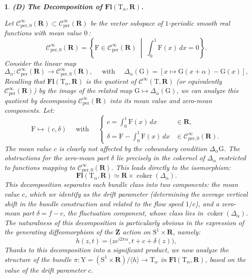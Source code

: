 \documentclass[10pt,letterpaper,reqno]{amsart}
\theoremstyle{article}
\newtheorem{article}[subsection]{}
\newcommand{\1}{{\hat 1}}
\newcommand{\0}{{\hat 0}}
\newcommand{\RR}{\mathbf R}
\newcommand{\ZZ}{\mathbf Z}
\def \F{\mathrm F}
\def \G{\mathrm G}
\def \S{\mathrm S}
\def \T{\mathrm T}
\def \Y{\mathrm Y}
\newcommand{\coker}{\operatorname{coker}}
\newcommand{\Cinfty}{\mathcal{C}^\infty}
\DeclareMathOperator{\Fb}{\boldsymbol{\mathsf{Fl}}}
\newcommand{\per}{\mathrm{per}}
\renewcommand{\Fb}{\mathbf{Fl}}
\begin{document}
\begin{article}
    \smallskip\textbf{(D)} \textbf{The Decomposition of $\Fb(\T_\alpha, \RR)$.}
    
    Let $\Cinfty_{\per,0}(\RR) \subset \Cinfty_{\per}(\RR) $ be the vector subspace of $1$-periodic smooth real functions with mean value $0$\,:
    $$
      \Cinfty_{\per,0}(\RR) = \left\{\F \in \Cinfty_{\per}(\RR) \;\middle|\; \int_0^1 \F(x)\, dx = 0 \right\}.
      $$
    Consider the linear map
    $$
      \Delta_\alpha : \Cinfty_{\per}(\RR) \to \Cinfty_{\per,0}(\RR), \quad \text{ with } \quad \Delta_\alpha(\G) = [x \mapsto \G(x + \alpha) - \G(x)],
      $$
    Recalling that $\Fb(\T_\alpha, \RR)$ is the quotient of $\Cinfty(\T, \RR)$ (or equivalently $\Cinfty_{\per}(\RR)$) by the image of the related map $\G \mapsto \Delta_\alpha(\G)$,
    we can analyze this quotient by decomposing $\Cinfty_{\per}(\RR)$ into its mean value and zero-mean components.
    Let:
    $$
      \F \mapsto (c,\delta) \quad \text{ with } \quad \left\{ \begin{array}{ll} \displaystyle c = \int_0^1\F(x)\,dx & \in \RR, \\ \displaystyle \delta = \F - \int_0^1\F(x)\,dx & \in \Cinfty_{\per,0}(\RR). \end{array} \right.
      $$
    The mean value $c$ is clearly not affected by the coboundary condition $\Delta_\alpha \G$.
    The obstructions for the zero-mean part $\delta$ lie precisely in the cokernel of $\Delta_\alpha$ restricted to functions mapping to $\Cinfty_{\per,0}(\RR)$.
    This leads directly to the isomorphism:
    \begin{equation*} %
      \label{Fb-alpha}
      \Fb(\T_\alpha, \RR) \simeq \RR \times \coker(\Delta_\alpha).
    \end{equation*}
    This decomposition separates each bundle class into two components:
    the mean value $c$,
    which we identify as the \emph{drift parameter}
    (determining the average vertical shift in the bundle construction and related to the flow speed $1/c$),
    and a zero-mean part $\delta = f - c$,
    the \emph{fluctuation component},
    whose class lies in $\coker(\Delta_\alpha)$.
    The naturalness of this decomposition is particularly obvious in the expression of the generating diffeomorphism of the $\ZZ$ action on $\S^1 \times \RR$,
    namely:
    $$
      h(z,t) = \big(z e^{i2\pi\alpha}, t + c + \delta(z)\big),
      $$
    Thanks to this decomposition into a significant product,
    we now analyze the structure of the bundle $\pi: \Y = (\S^1 \times \RR)/\langle h \rangle \to \T_\alpha$ in $\Fb(\T_\alpha, \RR)$,
    based on the value of the drift parameter $c$.
    

\end{article}
\end{document}
